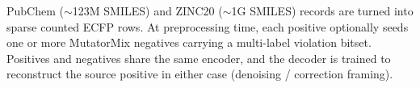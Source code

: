 \documentclass[border=0pt]{standalone}
\begin{document}
\color[HTML]{475569}
\sffamily\fontsize{10}{13}\selectfont
\setlength{\parindent}{0pt}
\begin{minipage}{320mm}
PubChem ($\sim$123M SMILES) and ZINC20 ($\sim$1G SMILES) records are turned into sparse counted ECFP rows. At preprocessing time, each positive optionally seeds one or more MutatorMix negatives carrying a multi-label violation bitset. Positives and negatives share the same encoder, and the decoder is trained to reconstruct the source positive in either case (denoising / correction framing).
\end{minipage}
\end{document}
